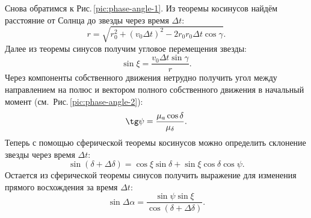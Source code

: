 Снова обратимся к Рис.\,\ref{pic:phase-angle-1}. Из теоремы косинусов найдём расстояние от Солнца до звезды через время $\Delta t$:
\begin{equation*}
	r = \sqrt{r_0^2 + (v_0 \Delta t)^2 - 2 r_0 r_0 \Delta t \cos \gamma}.
\end{equation*}
Далее из теоремы синусов получим угловое перемещения звезды:
\begin{equation*}
	\sin \xi = \frac{v_0 \Delta t \sin \gamma}{r}.
\end{equation*}
Через компоненты собственного движения нетрудно получить угол между направлением на полюс и вектором полного собственного движения в начальный момент (см.~Рис.\,\ref{pic:phase-angle-2}):
\begin{equation*}
	\tg \psi =  \frac{\mu_a \cos \delta}{\mu_\delta}.
\end{equation*}
Теперь с помощью сферической теоремы косинусов можно определить склонение звезды через время $\Delta t$:
\begin{equation*}
	\sin (\delta + \Delta \delta) = \cos \xi \sin \delta + \sin \xi \cos \delta \cos \psi.
\end{equation*}
Остается из сферической теоремы синусов получить выражение для изменения прямого восхождения за время $\Delta t$:
\begin{equation*}
	\sin \Delta \alpha = \frac{\sin \psi \sin \xi}{\cos (\delta + \Delta \delta)}.
\end{equation*}



